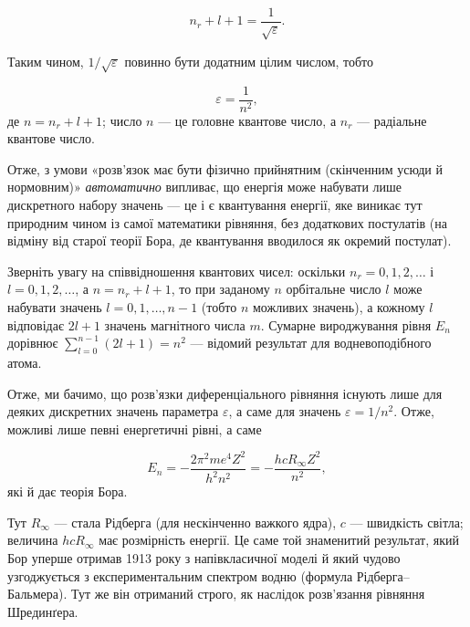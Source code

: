 \documentclass{article}
\begin{document}
\begin{equation}
n_r + l + 1 = \frac{1}{\sqrt{\varepsilon}}.
\end{equation}

Таким чином, $1/\sqrt{\varepsilon}$ повинно бути додатним цілим числом, тобто

\begin{equation}
\varepsilon = \frac{1}{n^2},
\end{equation}
%
де $n = n_r + l + 1$; число $n$ --- це головне квантове число, а $n_r$ --- радіальне квантове число.

\begin{note}
Отже, з умови «розв'язок має бути фізично прийнятним (скінченним усюди й нормовним)» \emph{автоматично} випливає, що енергія може набувати лише дискретного набору значень --- це і є квантування енергії, яке виникає тут природним чином із самої математики рівняння, без додаткових постулатів (на відміну від старої теорії Бора, де квантування вводилося як окремий постулат).

Зверніть увагу на співвідношення квантових чисел: оскільки $n_r = 0, 1, 2, \dots$ і $l = 0, 1, 2, \dots$, а $n = n_r+l+1$, то при заданому $n$ орбітальне число $l$ може набувати значень $l = 0, 1, \dots, n-1$ (тобто $n$ можливих значень), а кожному $l$ відповідає $2l+1$ значень магнітного числа $m$. Сумарне вироджування рівня $E_n$ дорівнює $\sum_{l=0}^{n-1}(2l+1) = n^2$ --- відомий результат для водневоподібного атома.
\end{note}

Отже, ми бачимо, що розв'язки диференціального рівняння існують лише для деяких дискретних значень параметра $\varepsilon$, а саме для значень $\varepsilon = 1/n^2$. Отже, можливі лише певні енергетичні рівні, а саме

\begin{equation}
E_n = - \frac{2\pi^2 me^4 Z^2}{h^2 n^2} = - \frac{h c R_\infty Z^2}{n^2},
\end{equation}
%
які й дає теорія Бора.

\begin{note}
Тут $R_\infty$ --- стала Рідберга (для нескінченно важкого ядра), $c$ --- швидкість світла; величина $hcR_\infty$ має розмірність енергії. Це саме той знаменитий результат, який Бор уперше отримав 1913 року з напівкласичної моделі й який чудово узгоджується з експериментальним спектром водню (формула Рідберга--Бальмера). Тут же він отриманий строго, як наслідок розв'язання рівняння Шрединґера.
\end{note}
\end{document}
